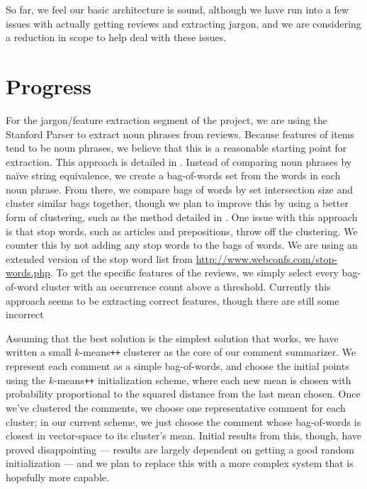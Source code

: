 \documentclass{article}
\begin{document}
So far, we feel our basic architecture is sound, although we have run into a
few issues with actually getting reviews and extracting jargon, and we are
considering a reduction in scope to help deal with these issues.

\section{Progress}
For the jargon/feature extraction segment of the project, we are using the Stanford Parser to extract noun phrases from reviews.  Because features of items tend to be noun phrases, we believe that this is a reasonable starting point for extraction.  This approach is detailed in \cite{opine}.  Instead of comparing noun phrases by na\" ive string equivalence, we create a bag-of-words set from the words in each noun phrase.  From there, we compare bags of words by set intersection size and cluster similar bags together, though we plan to improve this by using a better form of clustering, such as the method detailed in \cite{lexrank}.  One issue with this approach is that stop words, such as articles and prepositions, throw off the clustering.  We counter this by not adding any stop words to the bags of words.  We are using an extended version of the stop word list from \url{http://www.webconfs.com/stop-words.php}.  To get the specific features of the reviews, we simply select every bag-of-word cluster with an occurrence count above a threshold.  Currently this approach seems to be extracting correct features, though there are still some incorrect 


Assuming that the best solution is the simplest solution that works, we have
written a small $k$-means\texttt{++} clusterer as the core of our comment summarizer. We
represent each comment as a simple bag-of-words, and choose the initial points
using the $k$-means\texttt{++} initialization scheme, where each new mean is chosen
with probability proportional to the squared distance from the last mean
chosen. Once we've clustered the comments, we choose one representative comment
for each cluster; in our current scheme, we just choose the comment whose
bag-of-words is closest in vector-space to its cluster's mean.
Initial results from this, though, have proved disappointing --- results
are largely dependent on getting a good random initialization --- and
we plan to replace this with a more complex system that is hopefully more
capable.
\end{document}

